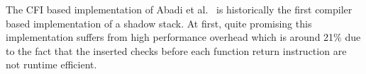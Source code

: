 The CFI based implementation of Abadi et al.~\cite{abadi:cfi} is historically the first compiler based implementation of a shadow stack.
At first, quite promising this implementation suffers from high performance overhead which is around 21\% due to the fact that the inserted checks before each 
function return instruction are not runtime efficient.

% 
% 
